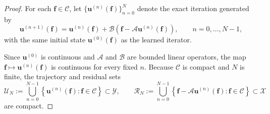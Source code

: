 \documentclass[10pt,a4paper]{amsart}
\begin{document}
			\begin{proof}
				For each $\boldsymbol f\in\mathcal C$, let
				$\{\boldsymbol u^{(n)}(\boldsymbol f)\}_{n=0}^{N}$ denote the exact
				iteration generated by
				\[
				\boldsymbol u^{(n+1)}(\boldsymbol f)
				=
				\boldsymbol u^{(n)}(\boldsymbol f)
				+
				\mathcal B
				\left(
				\boldsymbol f
				-
				\mathcal A\boldsymbol u^{(n)}(\boldsymbol f)
				\right),
				\qquad
				n=0,\ldots,N-1,
				\]
				with the same initial state
				$\boldsymbol u^{(0)}(\boldsymbol f)$ as the learned iterator.
				
				Since $\boldsymbol u^{(0)}$ is continuous and $\mathcal A$ and
				$\mathcal B$ are bounded linear operators, the map $\boldsymbol f
				\longmapsto\boldsymbol u^{(n)}(\boldsymbol f)$ is continuous for every fixed $n$. Because $\mathcal C$ is compact and
				$N$ is finite, the trajectory and residual sets
				\[
				\mathcal U_N
				:=
				\bigcup_{n=0}^{N-1}
				\left\{
				\boldsymbol u^{(n)}(\boldsymbol f):
				\boldsymbol f\in\mathcal C
				\right\}
				\subset\mathcal Y, \qquad
				\mathcal R_N
				:=
				\bigcup_{n=0}^{N-1}
				\left\{
				\boldsymbol f
				-
				\mathcal A\boldsymbol u^{(n)}(\boldsymbol f):
				\boldsymbol f\in\mathcal C
				\right\}
				\subset\mathcal X
				\]
				are compact. 
				

\end{proof}
\end{document}
